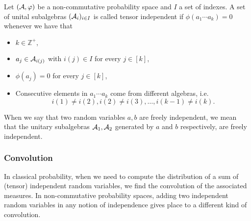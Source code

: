 

    \begin{definition}
        Let $(\mathcal A, \varphi)$ be a non-commutative probability space and $I$ a set of indexes. A set of unital subalgebras $(\mathcal A_{i})_{i\in I}$ is called tensor independent if $\phi(a_1 \cdots a_k) = 0$ whenever we have that

        \begin{itemize}
            \item $k \in \mathbb Z^+$,
            \item $a_j \in \mathcal A_{i(j)}$ with $i(j) \in I$ for every $j \in [k]$,
            \item $\phi(a_j) = 0$ for every $j \in [k]$,
            \item Consecutive elements in $a_1 \cdots a_k$ come from different algebras, i.e.
            \begin{equation*}
                i(1) \neq i(2), i(2) \neq i(3), \dots, i(k-1) \neq i(k).
            \end{equation*}
        \end{itemize}

        When we say that two random variables $a,b$ are freely independent, we mean that the unitary subalgebras $\mathcal A_1, \mathcal A_2$ generated by $a$ and $b$ respectively, are freely independent.

    \end{definition}


\subsubsection{Convolution}

    In classical probability, when we need to compute the distribution of a sum of (tensor) independent random variables, we find the convolution of the associated measures. In non-commutative probability spaces, adding two independent random variables in any notion of independence gives place to a different kind of convolution.

